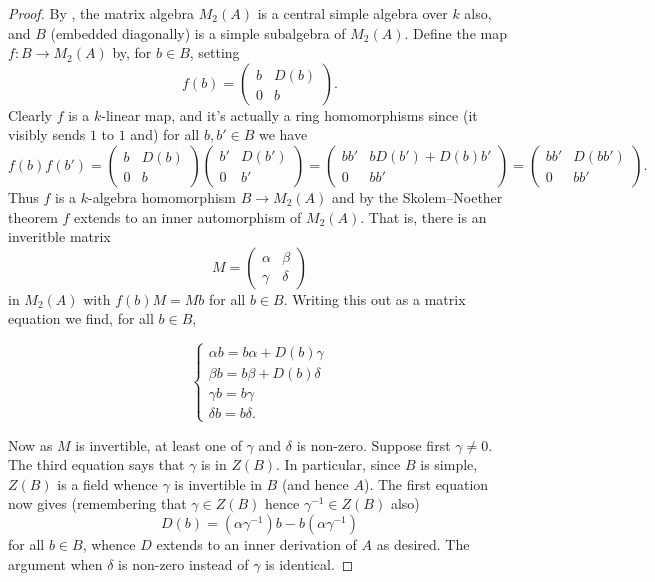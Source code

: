 \documentclass[11pt]{amsart}
\numberwithin{equation}{section}
\theoremstyle{remark}
\theoremstyle{remark}
\theoremstyle{remark}
\theoremstyle{definition}
\theoremstyle{definition}
\theoremstyle{definition}
\theoremstyle{definition}
\theoremstyle{definition}
\theoremstyle{definition}
\begin{document}
\begin{proof}
By  , the matrix algebra $M_2(A)$ is a central simple algebra over $k$ also, and $B$ (embedded diagonally) is a simple subalgebra of $M_2(A)$. Define the map $f:B\rightarrow M_2(A)$ by, for $b\in B$, setting
\[f(b)=\left(\begin{array}{cc}b&D(b)\\0&b\end{array}\right).\]
Clearly $f$ is a $k$-linear map, and it's actually a ring homomorphisms since (it visibly sends $1$ to $1$ and) for all $b,b'\in B$ we have
\[f(b)f(b')=\left(\begin{array}{cc}b&D(b)\\0&b\end{array}\right)\left(\begin{array}{cc}b'&D(b')\\0&b'\end{array}\right)=\left(\begin{array}{cc}bb'&bD(b')+D(b)b'\\0&bb'\end{array}\right)=\left(\begin{array}{cc}bb'&D(bb')\\0&bb'\end{array}\right).\]
Thus $f$ is a $k$-algebra homomorphism $B\rightarrow M_2(A)$ and by the Skolem--Noether theorem $f$ extends to an inner automorphism of $M_2(A)$. That is, there is an inveritble matrix
\[M=\left(\begin{array}{cc}\alpha&\beta\\\gamma&\delta\end{array}\right)\]
in $M_2(A)$ with $f(b)M=Mb$ for all $b\in B$. Writing this out as a matrix equation we find, for all $b\in B$,

\[\begin{cases} \alpha b=b\alpha+D(b)\gamma\\ \beta b=b\beta +D(b)\delta\\ \gamma b=b\gamma \\ \delta b=b\delta.\end{cases}\]

  Now as $M$ is invertible, at least one of $\gamma$ and $\delta$ is non-zero. Suppose first $\gamma\neq 0$. The third equation says that  $\gamma$ is in $Z(B)$. In particular, since $B$ is simple,  $Z(B)$ is a field whence $\gamma$ is invertible in $B$ (and hence $A$). The first equation now gives (remembering that $\gamma\in Z(B)$ hence $\gamma^{-1}\in Z(B)$ also)
  \[D(b)=(\alpha \gamma^{-1})b-b(\alpha \gamma^{-1})\]
  for all $b\in B$, whence $D$ extends to an inner derivation of $A$ as desired. The argument when $\delta$ is non-zero instead of $\gamma$ is identical. 
\end{proof}
\end{document}
